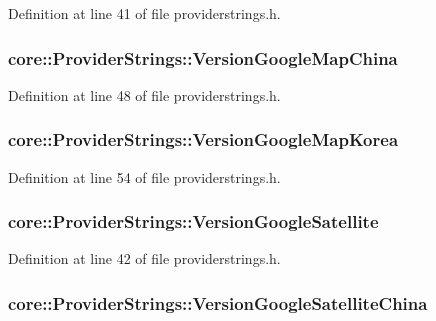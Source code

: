 \-Definition at line 41 of file providerstrings.\-h.

\hypertarget{group___o_p_map_widget_gae854c1eca4887d3d875bc5f26ace02f2}{
\subsubsection[{\-Version\-Google\-Map\-China}]{ {\bf core\-::\-Provider\-Strings\-::\-Version\-Google\-Map\-China}}}\label{group___o_p_map_widget_gae854c1eca4887d3d875bc5f26ace02f2}


\-Definition at line 48 of file providerstrings.\-h.

\hypertarget{group___o_p_map_widget_ga3487c2fed1d7acaa4c9d34e8b4afd9de}{
\subsubsection[{\-Version\-Google\-Map\-Korea}]{ {\bf core\-::\-Provider\-Strings\-::\-Version\-Google\-Map\-Korea}}}\label{group___o_p_map_widget_ga3487c2fed1d7acaa4c9d34e8b4afd9de}


\-Definition at line 54 of file providerstrings.\-h.

\hypertarget{group___o_p_map_widget_gaeca979ef517e8ce202c7ce19d8f0c52f}{
\subsubsection[{\-Version\-Google\-Satellite}]{ {\bf core\-::\-Provider\-Strings\-::\-Version\-Google\-Satellite}}}\label{group___o_p_map_widget_gaeca979ef517e8ce202c7ce19d8f0c52f}


\-Definition at line 42 of file providerstrings.\-h.

\hypertarget{group___o_p_map_widget_ga9305b4a54fb603c540a9a8c268a097ec}{
\subsubsection[{\-Version\-Google\-Satellite\-China}]{ {\bf core\-::\-Provider\-Strings\-::\-Version\-Google\-Satellite\-China}}}\label{group___o_p_map_widget_ga9305b4a54fb603c540a9a8c268a097ec}


